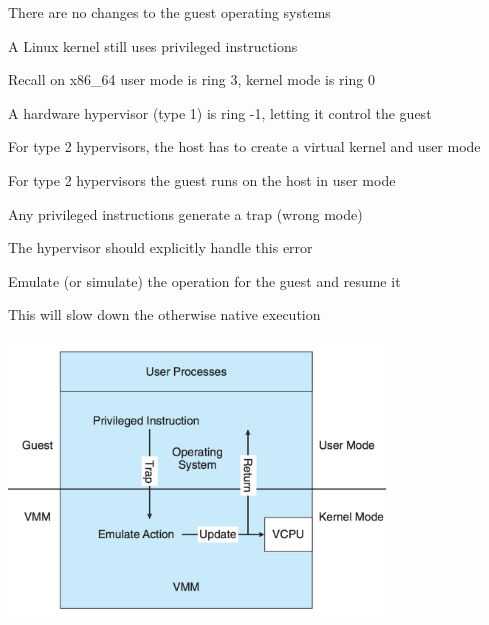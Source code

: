   \begin{slide}
    

    There are no changes to the guest operating systems

    \leftspace{}A Linux kernel still uses privileged instructions
    \medskip

    Recall on x86\_64 user mode is ring 3, kernel mode is ring 0

    \leftspace{}A hardware hypervisor (type 1) is ring -1, letting it control
                 the guest
    \medskip

    For type 2 hypervisors, the host has to create a virtual kernel and user
    mode

  \end{slide}

  \begin{slide}


    For type 2 hypervisors the guest runs on the host in user mode

    \leftspace{}Any privileged instructions generate a trap (wrong mode)
    \medskip

    The hypervisor should explicitly handle this error

    \leftspace{}Emulate (or simulate) the operation for the guest and resume it
    \medskip

    This will slow down the otherwise native execution

  \end{slide}

  \begin{slide}
    

    \begin{center}
      \includegraphics[width=0.75\textwidth]{trap-and-emulate.png}
    \end{center}

  \end{slide}

